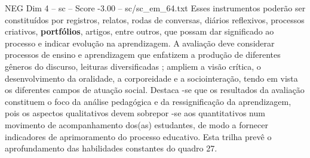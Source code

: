 \begin{textsample}{NEG Dim 4 – sc – Score -3.00 – sc/sc\_em\_64.txt}
Esses instrumentos poderão ser constituídos por registros, relatos, rodas de conversas, diários reflexivos, processos criativos, \textbf{portfólios}, artigos, entre outros, que possam dar significado ao processo e indicar evolução na aprendizagem.
A avaliação deve considerar processos de ensino e aprendizagem que enfatizem a produção de diferentes gêneros do discurso, leituras diversificadas ; ampliem a visão crítica, o desenvolvimento da oralidade, a corporeidade e a sociointeração, tendo em vista os diferentes campos de atuação social.
Destaca -se que os resultados da avaliação constituem o foco da análise pedagógica e da ressignificação da aprendizagem, pois os aspectos qualitativos devem sobrepor -se aos quantitativos num movimento de acompanhamento dos(as) estudantes, de modo a fornecer indicadores de aprimoramento do processo educativo.
Esta trilha prevê o aprofundamento das habilidades constantes do quadro 27.

\end{textsample}
